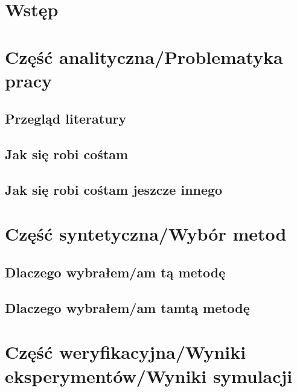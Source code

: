 

\graphicspath{{Images/}}


\tableofcontents
\thispagestyle{empty}
\thesisstyle
\newpage

\section[Wstęp]{Wstęp}
\lipsum[1-5]

\section[Część analityczna]{Część analityczna/Problematyka pracy}
\subsection{Przegląd literatury}
\lipsum[1-3]
\subsection{Jak się robi cośtam}
\lipsum[1-3]
\subsection{Jak się robi cośtam jeszcze innego}
\lipsum[1-2]

\newpage
\section[Część syntetyczna]{Część syntetyczna/Wybór metod}
\subsection{Dlaczego wybrałem/am tą metodę}
\lipsum[1-3]
\subsection{Dlaczego wybrałem/am tamtą metodę}
\lipsum[1-3]

\newpage
\section[Część weryfikacyjna]{Część weryfikacyjna/Wyniki eksperymentów/Wyniki symulacji}
